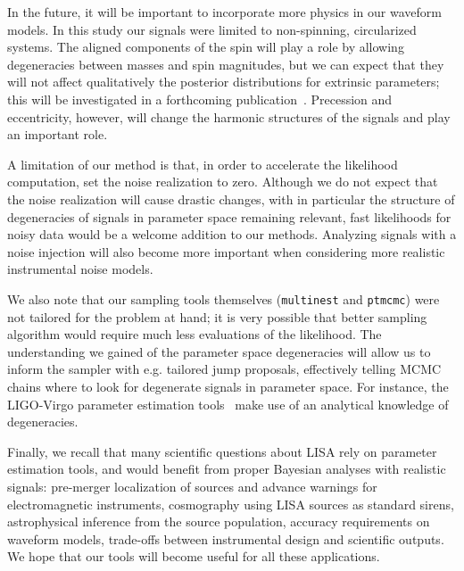 \documentclass[aps,showpacs,twocolumn,prd,superscriptaddress,nofootinbib]{revtex4-1}
\begin{document}
In the future, it will be important to incorporate more physics in our waveform models. In this study our signals were limited to non-spinning, circularized systems. The aligned components of the spin will play a role by allowing degeneracies between masses and spin magnitudes, but we can expect that they will not affect qualitatively the posterior distributions for extrinsic parameters; this will be investigated in a forthcoming publication~\cite{Katz+20}. Precession and eccentricity, however, will change the harmonic structures of the signals and play an important role.

A limitation of our method is that, in order to accelerate the likelihood computation, set the noise realization to zero. Although we do not expect that the noise realization will cause drastic changes, with in particular the structure of degeneracies of signals in parameter space remaining relevant, fast likelihoods for noisy data would be a welcome addition to our methods. Analyzing signals with a noise injection will also become more important when considering more realistic instrumental noise models.

We also note that our sampling tools themselves (\texttt{multinest} and \texttt{ptmcmc}) were not tailored for the problem at hand; it is very possible that better sampling algorithm would require much less evaluations of the likelihood. The understanding we gained of the parameter space degeneracies will allow us to inform the sampler with e.g. tailored jump proposals, effectively telling MCMC chains where to look for degenerate signals in parameter space. For instance, the LIGO-Virgo parameter estimation tools~\cite{Veitch+14} make use of an analytical knowledge of degeneracies.

Finally, we recall that many scientific questions about LISA rely on parameter estimation tools, and would benefit from proper Bayesian analyses with realistic signals: pre-merger localization of sources and advance warnings for electromagnetic instruments, cosmography using LISA sources as standard sirens, astrophysical inference from the source population, accuracy requirements on waveform models, trade-offs between instrumental design and scientific outputs. We hope that our tools will become useful for all these applications.



\appendix

\end{document}
